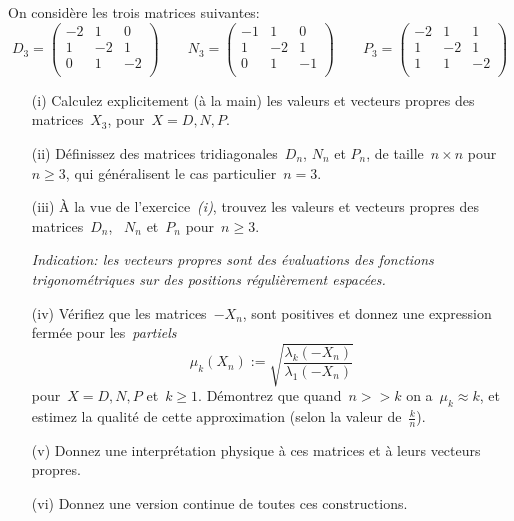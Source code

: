 \begin{exercice}
On considère les trois matrices suivantes:
\[
	D_3=\left(\begin{smallmatrix}
		-2 & 1 & 0 \\
		1 & -2 & 1 \\
		0 & 1 & -2 \\
\end{smallmatrix}\right)
	\qquad
	N_3=\left(\begin{smallmatrix}
		-1 & 1 & 0 \\
		1 & -2 & 1 \\
		0 & 1 & -1 \\
\end{smallmatrix}\right)
	\qquad
	P_3=\left(\begin{smallmatrix}
		-2 & 1 & 1 \\
		1 & -2 & 1 \\
		1 & 1 & -2 \\
\end{smallmatrix}\right)
\]

\begin{itemize}
	\item[(i)]
Calculez explicitement (à la main) les valeurs et vecteurs propres des
matrices~$X_3$, pour~$X=D,N,P$.


	\item[(ii)]
Définissez des matrices tridiagonales~$D_n$, $N_n$ et $P_n$, de taille~$n\times
n$ pour~$n\ge 3$, qui généralisent le cas particulier~$n=3$.

	\item[(iii)]
		À la vue de l'exercice~{\sl(i)}, trouvez les valeurs et vecteurs propres des
matrices~$D_n$, ~$N_n$ et~$P_n$ pour~$n\ge 3$.

{\sl\color{gray} Indication: les vecteurs propres sont des évaluations des fonctions
trigonométriques sur des positions régulièrement espacées.}


	\item[(iv)]
Vérifiez que les matrices~$-X_n$, sont positives et donnez une
expression fermée pour les~\emph{partiels}
\[
	\mu_k(X_n) := \sqrt{\frac{\lambda_k(-X_n)}{\lambda_1(-X_n)}}
\]
pour~$X=D,N,P$ et~$k\ge 1$.  Démontrez que quand~$n>\!\!>k$ on a~$\mu_k\approx k$,
et estimez la qualité de cette approximation (selon la valeur de~$\tfrac kn$).

	\item[(v)]
Donnez une interprétation physique à ces matrices et à leurs vecteurs propres.

	\item[(vi)]
Donnez une version continue de toutes ces constructions.
\end{itemize}
\end{exercice}


